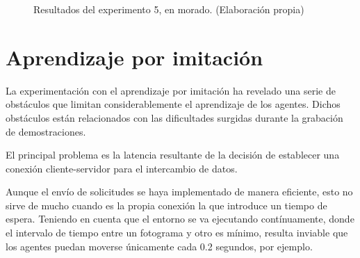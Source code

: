 \begin{figure} [H]
 \centering
 \caption[Resultados del experimento 5]{Resultados del experimento 5, en morado. (Elaboración propia)}
  \label{fig:exp5-plots}
\end{figure}

\newpage

\section{Aprendizaje por imitación}

La experimentación con el aprendizaje por imitación ha revelado una serie de obstáculos que limitan considerablemente el aprendizaje de los agentes. Dichos obstáculos están relacionados con las dificultades surgidas durante la grabación de demostraciones.

El principal problema es la latencia resultante de la decisión de establecer una conexión cliente-servidor para el intercambio de datos.

Aunque el envío de solicitudes se haya implementado de manera eficiente, esto no sirve de mucho cuando es la propia conexión la que introduce un tiempo de espera. Teniendo en cuenta que el entorno se va ejecutando contínuamente, donde el intervalo de tiempo entre un fotograma y otro es mínimo, resulta inviable que los agentes puedan moverse únicamente cada 0.2 segundos, por ejemplo.


